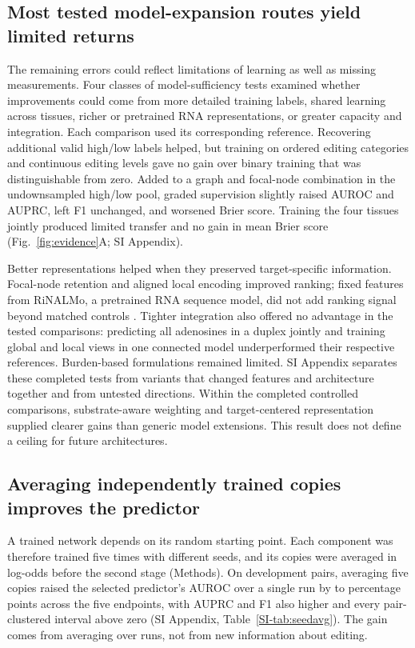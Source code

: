 \documentclass[9pt,twocolumn,twoside]{pnas-new}
\newcommand{\SIref}[1]{\ref*{SI-#1}}
\begin{document}
\subsection*{Most tested model-expansion routes yield limited returns}

The remaining errors could reflect limitations of learning as well as missing measurements. Four classes of model-sufficiency tests examined whether improvements could come from more detailed training labels, shared learning across tissues, richer or pretrained RNA representations, or greater capacity and integration. Each comparison used its corresponding reference. Recovering additional valid high/low labels helped, but training on ordered editing categories and continuous editing levels gave no gain over binary training that was distinguishable from zero. Added to a graph and focal-node combination in the undownsampled high/low pool, graded supervision slightly raised AUROC and AUPRC, left F1 unchanged, and worsened Brier score. Training the four tissues jointly produced limited transfer and no gain in mean Brier score (Fig.~\ref{fig:evidence}A; SI Appendix).

Better representations helped when they preserved target-specific information. Focal-node retention and aligned local encoding improved ranking; fixed features from RiNALMo, a pretrained RNA sequence model, did not add ranking signal beyond matched controls \cite{Penic2025}. Tighter integration also offered no advantage in the tested comparisons: predicting all adenosines in a duplex jointly and training global and local views in one connected model underperformed their respective references. Burden-based formulations remained limited. SI Appendix separates these completed tests from variants that changed features and architecture together and from untested directions. Within the completed controlled comparisons, substrate-aware weighting and target-centered representation supplied clearer gains than generic model extensions. This result does not define a ceiling for future architectures.

\subsection*{Averaging independently trained copies improves the predictor}

A trained network depends on its random starting point. Each component was therefore trained five times with different seeds, and its copies were averaged in log-odds before the second stage (Methods). On development pairs, averaging five copies raised the selected predictor's AUROC over a single run by \SeedAvgAUROCMin{} to \SeedAvgAUROCMax{} percentage points across the five endpoints, with AUPRC and F1 also higher and every pair-clustered interval above zero (SI Appendix, Table~\SIref{tab:seedavg}). The gain comes from averaging over runs, not from new information about editing.
\end{document}
